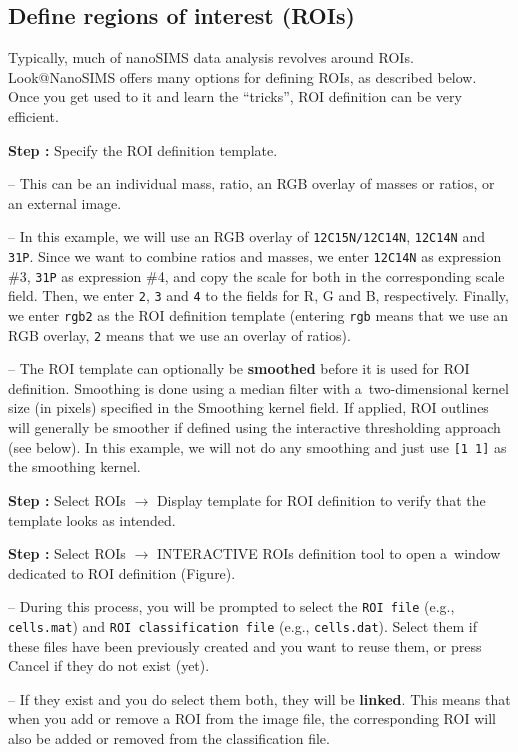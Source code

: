 \documentclass[a4paper, 11pt]{article}
\newcommand{\ttt}[1]{\texttt{#1}}
\newcommand{\lans}[1]{{\color{magenta}#1}}
\newcommand{\lanstf}[1]{{\color{cyan}#1}}
\newcommand\ra{\rightarrow}
\newcommand\addon[1]{-- {\small #1}}
\newcounter{step}
\newcommand\s{\addtocounter{step}{1}\noindent\textbf{Step \thestep:}{ }}
\newcommand\bb[1]{\textbf{#1}}
\begin{document}

\subsection{Define regions of interest (ROIs)}
\setcounter{step}{0}

Typically, much of nanoSIMS data analysis revolves around ROIs. Look@NanoSIMS offers many options for defining ROIs, as described below. Once you get used to it and learn the ``tricks'', ROI definition can be very efficient.

\s Specify the \lanstf{ROI definition template}. 

\addon{This can be an individual mass, ratio, an RGB overlay of masses or ratios, or an external image.}

\addon{In this example, we will use an RGB overlay of \ttt{12C15N/12C14N}, \ttt{12C14N} and \ttt{31P}. Since we want to combine ratios and masses, we enter \ttt{12C14N} as expression \#3, \ttt{31P} as expression \#4, and copy the scale for both in the corresponding \lanstf{scale} field. Then, we enter \ttt{2}, \ttt{3} and \ttt{4} to the fields for \lanstf{R}, \lanstf{G} and \lanstf{B}, respectively. Finally, we enter \ttt{rgb2} as the \lanstf{ROI definition template} (entering \ttt{rgb} means that we use an RGB overlay, \ttt{2} means that we use an overlay of ratios).}

\addon{The ROI template can optionally be \bb{smoothed} before it is used for ROI definition. Smoothing is done using a median filter with a~two-dimensional kernel size (in pixels) specified in the \lanstf{Smoothing kernel} field. If applied, ROI outlines will generally be smoother if defined using the \lans{interactive thresholding} approach (see below). In this example, we will not do any smoothing and just use \ttt{[1 1]} as the smoothing kernel.}

\s Select \lans{ROIs} $\ra$ \lans{Display template for ROI definition} to verify that the template looks as intended. 

\s Select \lans{ROIs} $\ra$ \lans{INTERACTIVE ROIs definition tool} to open a~window dedicated to ROI definition (Figure). 

\addon{During this process, you will be prompted to select the \ttt{ROI file} (e.g., \ttt{cells.mat}) and \ttt{ROI classification file} (e.g., \ttt{cells.dat}). Select them if these files have been previously created and you want to reuse them, or press \lans{Cancel} if they do not exist (yet).} 

\addon{If they exist and you do select them both, they will be \bb{linked}. This means that when you add or remove a ROI from the image file, the corresponding ROI will also be added or removed from the classification file.}
\end{document}
